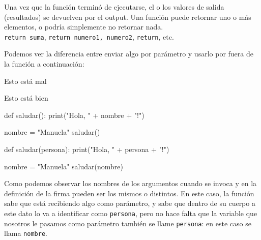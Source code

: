 \documentclass[
  letterpaper,
  DIV=11,
  numbers=noendperiod]{scrreprt}
\newenvironment{Shaded}{\begin{snugshade}}{\end{snugshade}}
\newcommand{\BuiltInTok}[1]{\textcolor[rgb]{0.00,0.23,0.31}{#1}}
\newcommand{\KeywordTok}[1]{\textcolor[rgb]{0.00,0.23,0.31}{#1}}
\newcommand{\NormalTok}[1]{\textcolor[rgb]{0.00,0.23,0.31}{#1}}
\newcommand{\OperatorTok}[1]{\textcolor[rgb]{0.37,0.37,0.37}{#1}}
\newcommand{\StringTok}[1]{\textcolor[rgb]{0.13,0.47,0.30}{#1}}
\begin{document}
Una vez que la función terminó de ejecutarse, el o los valores de salida
(resultados) se devuelven por el output. Una función puede retornar uno
o más elementos, o podría simplemente no retornar nada.\\
\texttt{return\ suma}, \texttt{return\ numero1,\ numero2},
\texttt{return}, etc.

Podemos ver la diferencia entre enviar algo por parámetro y usarlo por
fuera de la función a continuación:

Esto está mal

Esto está bien

\begin{Shaded}
\begin{Highlighting}[]
\KeywordTok{def}\NormalTok{ saludar():}
  \BuiltInTok{print}\NormalTok{(}\StringTok{"Hola, "} \OperatorTok{+}\NormalTok{ nombre }\OperatorTok{+} \StringTok{"!"}\NormalTok{)}

\NormalTok{nombre }\OperatorTok{=} \StringTok{"Manuela"}
\NormalTok{saludar()}
\end{Highlighting}
\end{Shaded}

\begin{Shaded}
\begin{Highlighting}[]
\KeywordTok{def}\NormalTok{ saludar(persona):}
  \BuiltInTok{print}\NormalTok{(}\StringTok{"Hola, "} \OperatorTok{+}\NormalTok{ persona }\OperatorTok{+} \StringTok{"!"}\NormalTok{)}

\NormalTok{nombre }\OperatorTok{=} \StringTok{"Manuela"}
\NormalTok{saludar(nombre)}
\end{Highlighting}
\end{Shaded}

\begin{tcolorbox}[enhanced jigsaw, bottomrule=.15mm, leftrule=.75mm, opacityback=0, colback=white, toprule=.15mm, bottomtitle=1mm, opacitybacktitle=0.6, rightrule=.15mm, left=2mm, arc=.35mm, coltitle=black, title=\textcolor{quarto-callout-tip-color}{\faLightbulb}\hspace{0.5em}{Tip}, breakable, toptitle=1mm, colframe=quarto-callout-tip-color-frame, titlerule=0mm, colbacktitle=quarto-callout-tip-color!10!white]

Como podemos observar los nombres de los argumentos cuando se invoca y
en la definición de la firma pueden ser los mismos o distintos. En este
caso, la función sabe que está recibiendo algo como parámetro, y sabe
que dentro de su cuerpo a este dato lo va a identificar como
\texttt{persona}, pero no hace falta que la variable que nosotros le
pasamos como parámetro también se llame \texttt{persona}: en este caso
se llama \texttt{nombre}.\\

\end{tcolorbox}
\end{document}
